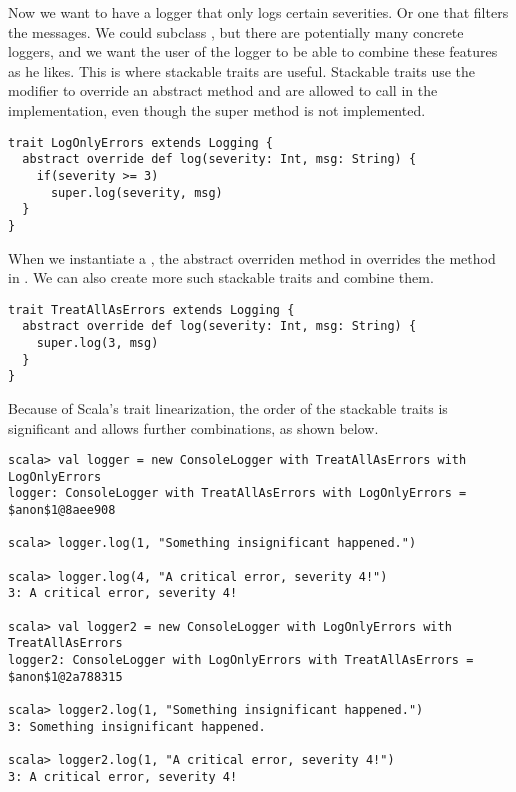 \documentclass[10pt,a4paper,oneside]{scrreprt}
\begin{document}
Now we want to have a logger that only logs certain severities. Or one that filters the messages. We could subclass , but there are potentially many concrete loggers, and we want the user of the logger to be able to combine these features as he likes. This is where stackable traits are useful. Stackable traits use the  modifier to override an abstract method and are allowed to call  in the implementation, even though the super method is not implemented.

\begin{lstlisting}
trait LogOnlyErrors extends Logging {
  abstract override def log(severity: Int, msg: String) {
    if(severity >= 3)
      super.log(severity, msg)
  }
}
\end{lstlisting}

When we instantiate a , the abstract overriden method in  overrides the  method in . We can also create more such stackable traits and combine them.

\begin{lstlisting}
trait TreatAllAsErrors extends Logging {
  abstract override def log(severity: Int, msg: String) {
    super.log(3, msg)
  }
}
\end{lstlisting}

Because of Scala's trait linearization, the order of the stackable traits is significant and allows further combinations, as shown below.

\begin{lstlisting}
scala> val logger = new ConsoleLogger with TreatAllAsErrors with LogOnlyErrors  
logger: ConsoleLogger with TreatAllAsErrors with LogOnlyErrors = $anon$1@8aee908

scala> logger.log(1, "Something insignificant happened.")

scala> logger.log(4, "A critical error, severity 4!")
3: A critical error, severity 4!

scala> val logger2 = new ConsoleLogger with LogOnlyErrors with TreatAllAsErrors
logger2: ConsoleLogger with LogOnlyErrors with TreatAllAsErrors = $anon$1@2a788315

scala> logger2.log(1, "Something insignificant happened.")
3: Something insignificant happened.

scala> logger2.log(1, "A critical error, severity 4!")
3: A critical error, severity 4!
\end{lstlisting}
\end{document}
